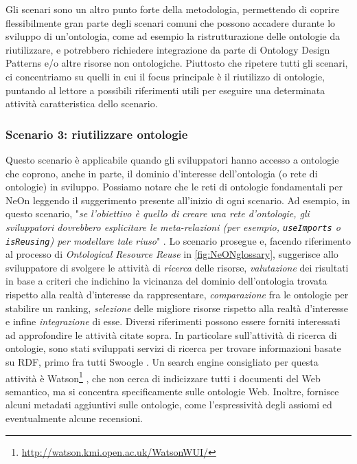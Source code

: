 Gli scenari sono un altro punto forte della metodologia, permettendo di coprire flessibilmente gran parte degli scenari comuni che possono accadere durante lo sviluppo di un'ontologia, come ad esempio la ristrutturazione delle ontologie da riutilizzare, e potrebbero richiedere integrazione da parte di Ontology Design Patterns \cite{ODP} e/o altre risorse non ontologiche. Piuttosto che ripetere tutti gli scenari, ci concentriamo su quelli in cui il focus principale è il riutilizzo di ontologie, puntando al lettore a possibili riferimenti utili per eseguire una determinata attività caratteristica dello scenario.
\subsubsection*{Scenario 3: riutilizzare ontologie}
\label{sec:Scenario3}
Questo scenario è applicabile quando gli sviluppatori hanno accesso a ontologie che coprono, anche in parte, il dominio d'interesse dell'ontologia (o rete di ontologie) in sviluppo. Possiamo notare che le reti di ontologie fondamentali per NeOn leggendo il suggerimento presente all'inizio di ogni scenario. Ad esempio, in questo scenario, "\textsl{se l'obiettivo è quello di creare una rete d'ontologie, gli sviluppatori dovrebbero esplicitare le meta-relazioni (per esempio, \texttt{useImports} o \texttt{isReusing}) per modellare tale riuso}" \cite{NeOn}. Lo scenario prosegue e, facendo riferimento al processo di \textit{Ontological Resource Reuse} in \autoref{fig:NeONglossary}, suggerisce allo sviluppatore di svolgere le attività di \textit{ricerca} delle risorse, \textit{valutazione} dei risultati in base a criteri che indichino la vicinanza del dominio dell'ontologia trovata rispetto alla realtà d'interesse da rappresentare, \textit{comparazione} fra le ontologie per stabilire un ranking, \textit{selezione} delle migliore risorse rispetto alla realtà d'interesse e infine \textit{integrazione} di esse. Diversi riferimenti possono essere forniti interessati ad approfondire le attività citate sopra. In particolare sull'attività di ricerca di ontologie, sono stati sviluppati servizi di ricerca per trovare informazioni basate su RDF, primo fra tutti Swoogle \cite{swoogle}. Un search engine consigliato per questa attività è Watson\footnote{\url{http://watson.kmi.open.ac.uk/WatsonWUI/}} \cite{watson}, che non cerca di indicizzare tutti i documenti del Web semantico, ma si concentra specificamente sulle ontologie Web. Inoltre, fornisce alcuni metadati aggiuntivi sulle ontologie, come l'espressività degli assiomi ed eventualmente alcune recensioni.

